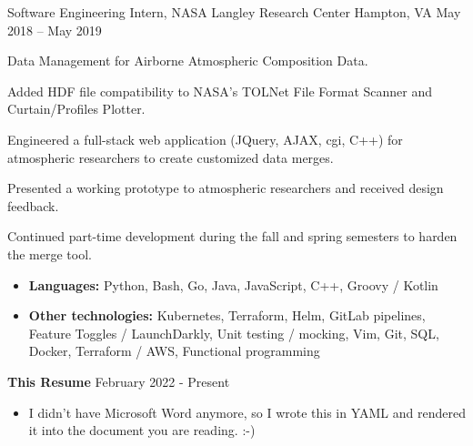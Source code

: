 \documentclass[letterpaper,10pt]{article}
\begin{document}
\begin{job}
{Software Engineering Intern, NASA Langley Research Center}
{Hampton, VA}
{May 2018 -- May 2019}
    \item Data Management for Airborne Atmospheric Composition Data.
    \item Added HDF file compatibility to NASA’s TOLNet File Format Scanner and Curtain/Profiles Plotter.
    \item Engineered a full-stack web application (JQuery, AJAX, cgi, C++) for atmospheric researchers to create customized data merges.
    \item Presented a working prototype to atmospheric researchers and received design feedback.
    \item Continued part-time development during the fall and spring semesters to harden the merge tool.
\end{job}

\vspace{-1em}

\begin{minipage}{0.8\textwidth}
\begin{itemize}
\item\textbf{Languages:} Python, Bash, Go, Java, JavaScript, C++, Groovy / Kotlin\\
\item\textbf{Other technologies:} Kubernetes, Terraform, Helm, GitLab pipelines, Feature Toggles / LaunchDarkly, Unit testing / mocking, Vim, Git, SQL, Docker, Terraform / AWS, Functional programming
\end{itemize}
\end{minipage}
\vspace{-1em}

\newenvironment{project}[2]
{
    \noindent\textbf{#1} \hfill #2\\
    \begin{minipage}{0.8\textwidth}
    \begin{itemize}
}
{
    \end{itemize}
    \end{minipage}
}


\begin{project}{This Resume}{February 2022 - Present}
    \item I didn’t have Microsoft Word anymore, so I wrote this in YAML and rendered it into the document you are reading. :-)
\end{project}
\end{document}
